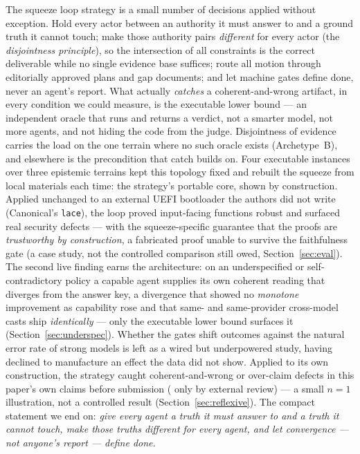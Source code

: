 \documentclass[11pt]{article}
\newcommand{\code}[1]{\texttt{#1}}
\begin{document}
The squeeze loop strategy is a small number of decisions applied without exception. Hold every
actor between an authority it must answer to and a ground truth it cannot touch; make those authority
pairs \emph{different} for every actor (the \emph{disjointness principle}), so the intersection of all
constraints is the correct deliverable while no single evidence base suffices; route all motion through
editorially approved plans and gap documents; and let machine gates define done, never an agent's
report. What actually \emph{catches} a coherent-and-wrong artifact, in every condition we could measure,
is the executable lower bound --- an independent oracle that runs and returns a verdict, not a smarter
model, not more agents, and not hiding the code from the judge. Disjointness of evidence carries the load
on the one terrain where no such oracle exists (Archetype~B), and elsewhere is the precondition that
catch builds on. Four executable instances over three
epistemic terrains kept this topology fixed and rebuilt the squeeze from local materials each
time: the strategy's portable core, shown by construction. Applied unchanged to an external UEFI
bootloader the authors did not write (Canonical's \code{lace}), the loop proved \ResRWRobust{}
input-facing functions robust and surfaced \ResRWBugsNum{} real security defects --- with the
squeeze-specific guarantee that
the proofs are \emph{trustworthy by construction}, a fabricated proof unable to survive the
faithfulness gate (a case study, not the controlled comparison still owed, Section~\ref{sec:eval}).
The second live finding earns the architecture: on an underspecified or self-contradictory policy
a capable agent supplies its own coherent reading that diverges from the answer key, a divergence
that showed no \emph{monotone} improvement as capability rose and that same- and same-provider
cross-model casts ship \emph{identically} --- only the executable lower bound surfaces it
(Section~\ref{sec:underspec}). Whether the gates shift outcomes
against the natural error rate of strong models is left as a wired but underpowered study, having
declined to manufacture an effect the data did not show. Applied to its own construction, the strategy caught \ResReflexDefects{}
coherent-and-wrong or over-claim defects in this paper's own claims before submission (\ResCalibExternalCatches{}
only by external review) --- a small $n{=}1$
illustration, not a controlled result (Section~\ref{sec:reflexive}). The compact statement we end
on: \emph{give every agent a truth it must answer to and a truth it cannot touch, make those
truths different for every agent, and let convergence --- not anyone's report --- define done.}
\end{document}
